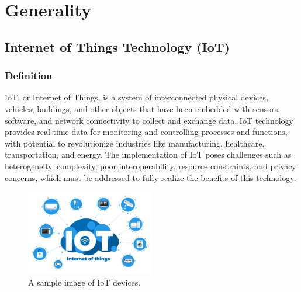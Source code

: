 \documentclass[12pt]{report}
\begin{document}
	
	\tableofcontents
	\listoffigures
	\listoftables
	
	
	\chapter{Generality}
	\section{Internet of Things Technology (IoT) }
	\subsection{Definition}
	
IoT, or Internet of Things, is a system of interconnected physical devices, vehicles, buildings, and other objects that have been embedded with sensors, software, and network connectivity to collect and exchange data.
IoT technology provides real-time data for monitoring and controlling processes and functions, with potential to revolutionize industries like manufacturing, healthcare, transportation, and energy.
The implementation of IoT poses challenges such as heterogeneity, complexity, poor interoperability, resource constraints, and privacy concerns, which must be addressed to fully realize the benefits of this technology.\cite{dai2019blockchain}
	\begin{figure}[H]
	\centering
	\includegraphics[width=0.5\textwidth]{iot.jpg}
	\caption{A sample image of IoT devices\cite{globalsign-iot}.}
	\label{fig:iot}
\end{figure}
\end{document}
